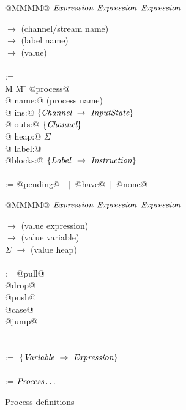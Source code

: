 
\begin{figure}
\begin{minipage}[t]{0.4\textwidth}
\begin{tabbing}
\Instr \TABDEF @MMMM@  \TABSKIP $\textit{Expression}$ \TABSKIP $\textit{Expression}$ \TABSKIP $\textit{Expression}$ \kill

\Chan \> $\to$ \> (channel/stream name) \\
\Label \> $\to$ \> (label name) \\
\Value \> $\to$ \> (value) \\
\\

\Proc \>:=\> \\
M \= M \= \kill
\> @process@ \\
\> \> @  name:@  (process name) \\
\> \> @   ins:@  $\{\textit{Channel} ~\to~ \textit{InputState}\}$ \\
\> \> @  outs:@  $\{ \textit{Channel} \}$ \\
\> \> @  heap:@  $\Sigma$ \\
\> \> @ label:@  \Label \\
\> \> @blocks:@  $\{Label ~\to~ \textit{Instruction}\}$ \\
\\
\Instr \TABDEF \kill
\InputState \> := \> @pending@~\Value~$|$~@have@~$|$~@none@

\end{tabbing}
\end{minipage}
\begin{minipage}[t]{0.05\textwidth}
\quad
\end{minipage}
\begin{minipage}[t]{0.4\textwidth}
\begin{tabbing}
\Instr \TABDEF @MMMM@  \TABSKIP $\textit{Expression}$ \TABSKIP $\textit{Expression}$ \TABSKIP $\textit{Expression}$ \kill

\Exp \> $\to$ \> (value expression) \\
\Var \> $\to$ \> (value variable) \\
$\Sigma$ \> $\to$ \> (value heap) \\
\\

\Instr
    \> :=\> @pull@  \> \Chan  \> \Var  \> \Goto \\
    \TABALT @drop@  \> \Chan  \>       \> \Goto \\
    \TABALT @push@  \> \Chan  \> \Exp  \> \Goto \\
    \TABALT @case@  \> \Exp   \> \Goto \> \Goto \\
    \TABALT @jump@  \>        \>       \> \Goto \\
\\
\\
\Goto \> := \> \Label $[\{\textit{Variable} ~\to~ \textit{Expression}\}]$ \\
\\
\Nest \> := \> $\textit{Process}\ldots$ \\
\end{tabbing}
\end{minipage}

\caption{Process definitions}
\label{fig:Process:Def}
\end{figure}


